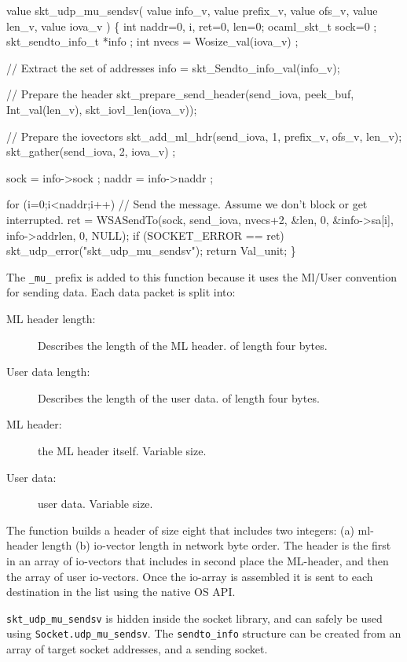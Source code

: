 \begin{codebox}
value skt_udp_mu_sendsv(
	value info_v,
	value prefix_v,
	value ofs_v,
	value len_v,
	value iova_v
) \{
    int naddr=0, i, ret=0, len=0;
    ocaml_skt_t sock=0 ;
    skt_sendto_info_t *info ;
    int nvecs = Wosize_val(iova_v) ;

    // Extract the set of addresses
    info = skt_Sendto_info_val(info_v);

    // Prepare the header
    skt_prepare_send_header(send_iova, peek_buf, Int_val(len_v), skt_iovl_len(iova_v));

    // Prepare the iovectors
    skt_add_ml_hdr(send_iova, 1, prefix_v, ofs_v, len_v);
    skt_gather(send_iova, 2, iova_v) ;
    
    sock = info->sock ;
    naddr = info->naddr ;

    for (i=0;i<naddr;i++) {
	// Send the message.  Assume we don't block or get interrupted.  
	ret = WSASendTo(sock, send_iova, nvecs+2, &len, 0,
			&info->sa[i], info->addrlen, 0, NULL);
	if (SOCKET_ERROR == ret) skt_udp_error("skt_udp_mu_sendsv");
    }
    return Val_unit;
\}
\end{codebox}

The {\tt \_mu\_} prefix is added to this function
because it uses the Ml/User convention for sending data. Each data
packet is split into:
\begin{description}
\item [ML header length:] Describes the length of the ML header. of length four bytes. 
\item [User data length:] Describes the length of the user data. of length four bytes. 
\item [ML header:] the ML header itself. Variable size.
\item [User data:] user data. Variable size.
\end{description}

The function builds a header of size eight that includes two integers: (a)
ml-header length (b) io-vector length in network byte order. The
header is the first in an array of io-vectors that includes in second
place the ML-header, and then the array of user io-vectors. Once the
io-array is assembled it is sent to each destination in the list using
the native OS API. 

{\tt skt\_udp\_mu\_sendsv} is hidden inside the socket library, and can
safely be used using {\tt Socket.udp\_mu\_sendsv}. The {\tt sendto\_info}
structure can be created from an array of target socket addresses, and
a sending socket.

